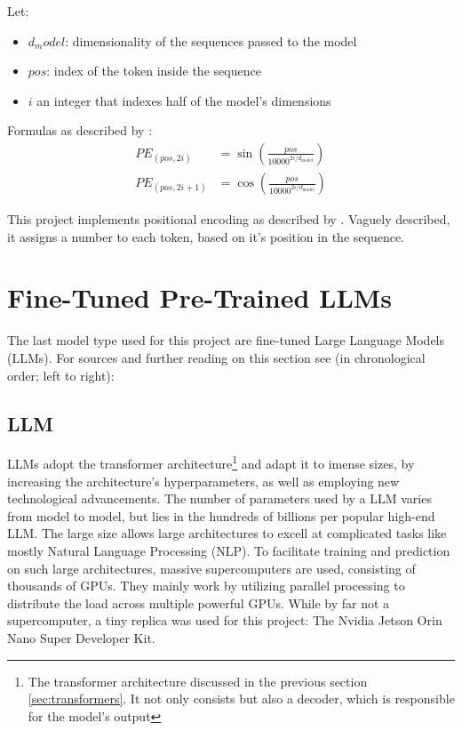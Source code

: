 \documentclass{article}
\begin{document}
Let:
\begin{itemize}
    \item $d_model$: dimensionality of the sequences passed to the model
    \item $pos$: index of the token inside the sequence
    \item $i$ an integer that indexes half of the model's dimensions
\end{itemize}
Formulas as described by \cite{vaswani2023attentionneed}: 
\begin{align}
PE_{(pos, 2i)} &= \sin\left(\frac{pos}{10000^{2i/d_{\text{model}}}}\right) \\
PE_{(pos, 2i+1)} &= \cos\left(\frac{pos}{10000^{2i/d_{\text{model}}}}\right)
\end{align}

This project implements positional encoding as described by \cite{vaswani2023attentionneed}. Vaguely described, it assigns a number to each token, based on it's position in the sequence.

\section{Fine-Tuned Pre-Trained LLMs}
The last model type used for this project are fine-tuned Large Language Models (LLMs).
For sources and further reading on this section see (in chronological order; left to right): \cite{geeksforgeeks_2024,Stryker_LLM,srinivasan2024transformer,Bergmann_Fine_Tuning}

\subsection{LLM}
LLMs adopt the transformer architecture\footnote{The transformer architecture discussed in the previous section \ref{sec:transformers}. It not only consists but also a decoder, which is responsible for the model's output} and adapt it to imense sizes, by increasing the architecture's hyperparameters, as well as employing new technological advancements. The number of parameters used by a LLM varies from model to model, but lies in the hundreds of billions per popular high-end LLM.
The large size allows large architectures to excell at complicated tasks like mostly Natural Language Processing (NLP).
To facilitate training and prediction on such large architectures, massive supercomputers are used, consisting of thousands of GPUs. They mainly work by utilizing parallel processing to distribute the load across multiple powerful GPUs. While by far not a supercomputer, a tiny replica was used for this project: The Nvidia Jetson Orin Nano Super Developer Kit.
\end{document}
